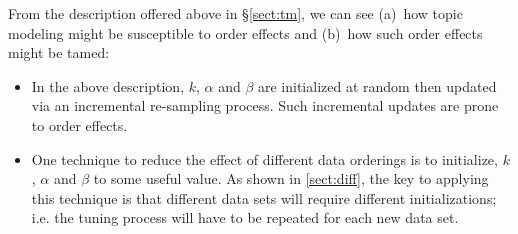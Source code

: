 \documentclass[twocolumn,5p,sort&compress]{elsarticle}
\newcommand{\tion}[1]{\ref{sect:#1}}
\newcommand{\bi}{\begin{itemize}}
\newcommand{\ei}{\end{itemize}}
\theoremstyle{break}
\begin{document}
From the description offered above in \S\ref{sect:tm},
we can see (a)~how topic modeling might be susceptible to order effects and (b)~how such order
effects might be tamed:
\bi
\item
  In the above description, $k$, $\alpha$ and $\beta$ are initialized at random
then updated via an incremental re-sampling process. Such incremental updates are prone to order effects.
\item
  One technique to reduce the effect of different data orderings is to initialize, $k$, $\alpha$ and $\beta$ to some
  useful value. As shown in \tion{diff},
the key to  applying this technique is that different data sets will require different
  initializations; i.e. the tuning process will have to be repeated for each new data set.
\ei
  






\end{document}

